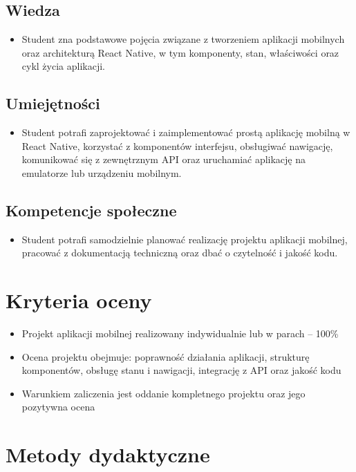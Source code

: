 \documentclass[12pt, a4paper]{article}
\begin{document}
\subsection*{Wiedza}
\begin{itemize}
  \item Student zna podstawowe pojęcia związane z tworzeniem aplikacji mobilnych oraz architekturą React Native, w tym komponenty, stan, właściwości oraz cykl życia aplikacji.
\end{itemize}

\subsection*{Umiejętności}
\begin{itemize}
  \item Student potrafi zaprojektować i zaimplementować prostą aplikację mobilną w React Native, korzystać z komponentów interfejsu, obsługiwać nawigację, komunikować się z zewnętrznym API oraz uruchamiać aplikację na emulatorze lub urządzeniu mobilnym.
\end{itemize}

\subsection*{Kompetencje społeczne}
\begin{itemize}
  \item Student potrafi samodzielnie planować realizację projektu aplikacji mobilnej, pracować z dokumentacją techniczną oraz dbać o czytelność i jakość kodu.
\end{itemize}

\section{Kryteria oceny}

\begin{itemize}
  \item Projekt aplikacji mobilnej realizowany indywidualnie lub w parach – 100\%
  \item Ocena projektu obejmuje: poprawność działania aplikacji, strukturę komponentów, obsługę stanu i nawigacji, integrację z API oraz jakość kodu
  \item Warunkiem zaliczenia jest oddanie kompletnego projektu oraz jego pozytywna ocena
\end{itemize}

\section{Metody dydaktyczne}
\end{document}
